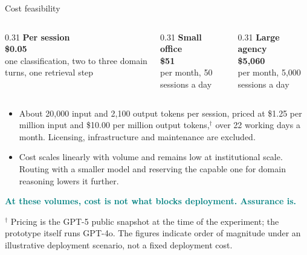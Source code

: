 \documentclass[aspectratio=169,10pt]{beamer}
\newcommand{\hl}[1]{\textcolor{teal}{\textbf{#1}}}      %
\newcommand{\cmt}[1]{{\color{stone}\small #1}}          %
\begin{document}
\begin{frame}{Cost feasibility}
  \begin{columns}[T]
    \begin{column}{0.31\textwidth}
      \centering
      \textbf{Per session}\\[0.4em]
      {\Large\color{teal}\bfseries \$0.05}\\[0.4em]
      \cmt{one classification, two to three domain turns, one retrieval step}
    \end{column}
    \begin{column}{0.31\textwidth}
      \centering
      \textbf{Small office}\\[0.4em]
      {\Large\color{teal}\bfseries \$51}\\[0.4em]
      \cmt{per month, 50 sessions a day}
    \end{column}
    \begin{column}{0.31\textwidth}
      \centering
      \textbf{Large agency}\\[0.4em]
      {\Large\color{teal}\bfseries \$5,060}\\[0.4em]
      \cmt{per month, 5,000 sessions a day}
    \end{column}
  \end{columns}
  \vfill
  \begin{itemize}\small
    \item About 20,000 input and 2,100 output tokens per session, priced at \$1.25 per million
      input and \$10.00 per million output tokens,$^{\dagger}$ over 22 working days a month.
      Licensing, infrastructure and maintenance are excluded.
    \item Cost scales linearly with volume and remains low at institutional scale. Routing with
      a smaller model and reserving the capable one for domain reasoning lowers it further.
  \end{itemize}
  \vfill
  \centering
  \hl{At these volumes, cost is not what blocks deployment. Assurance is.}
  \vfill
  \raggedright
  {\color{stone}\footnotesize $^{\dagger}$ Pricing is the GPT-5 public snapshot at the time of
   the experiment; the prototype itself runs GPT-4o. The figures indicate order of magnitude
   under an illustrative deployment scenario, not a fixed deployment cost.}
\end{frame}
\end{document}
